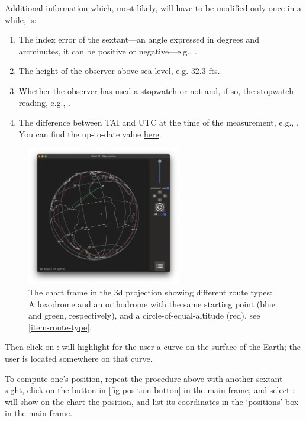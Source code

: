 \documentclass{ol-softwaremanual}
\begin{document}
  Additional information which, most likely, will have to be modified only once in a while, is: 
  \begin{enumerate}[resume]
    \item \label{item-index-error} The index error \cite{bowditch2002the} of the \gls{sextant}---an angle expressed in degrees and arcminutes, it can be positive or negative---e.g., .
    \item \label{item-observer-height} The height of the observer above sea level, e.g. $32.3$ \acp{ft}.
    \item \label{item-stopwatch} Whether the observer has used a stopwatch or not and, if so, the stopwatch reading, e.g., .
    \item \label{item-tai-utc} The difference between \ac{TAI} and \ac{UTC} at the time of the measurement, e.g., .  You can find the up-to-date value  \href{https://en.wikipedia.org/wiki/Leap_second}{here}. 
  \end{enumerate}

  \begin{figure}
    \includegraphics[width=0.6\textwidth]{figures/route-types.png}
    \centering
    \caption{
      \label{fig-route-types}
      The chart frame in the 3d projection showing different \gls{route} types: A \gls{loxodrome} and an \gls{orthodrome} with the same starting point (blue and green, respectively), and a \gls{circle-of-equal-altitude} (red), see \cref{item-route-type}. 
    }
    \end{figure}

  Then click on : \thel will highlight for the user a curve on the surface of the Earth; the user is located somewhere on that curve. 

To compute one's \gls{position}, repeat the procedure above with another \gls{sextant} \gls{sight}, click on the button in \cref{fig-position-button} in the main frame, and select : \thel will show on the chart the \gls{position}, and list its coordinates in the `\Glspl{position}' box in the main frame. 
\end{document}
